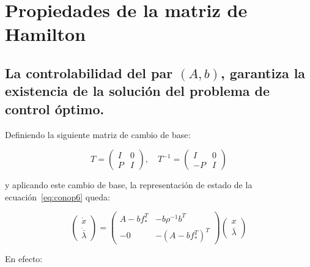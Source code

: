     \newpage
    \section{Propiedades de la matriz de Hamilton}

        \subsection{La controlabilidad del par $(A, b)$, garantiza la existencia de la solución del problema de control óptimo.}

            Definiendo la siguiente matriz de cambio de base:

            \begin{equation}
                T =
                \begin{pmatrix}
                    I & 0 \\
                    P & I
                \end{pmatrix}, \quad T^{-1} =
                \begin{pmatrix}
                    I & 0 \\
                    -P & I
                \end{pmatrix}
            \end{equation}

            y aplicando este cambio de base, la representación de estado de la ecuación~\ref{eq:conop6} queda:

            \begin{equation} \label{eq:conop10}
                \begin{pmatrix}
                    \dot{x} \\
                    \dot{\bar{\lambda}}
                \end{pmatrix} =
                \begin{pmatrix}
                    A - b f_*^T & -b \rho^{-1} b^T \\
                    -0 & - (A - b f_*^T)^T
                \end{pmatrix}
                \begin{pmatrix}
                    x \\
                    \bar{\lambda}
                \end{pmatrix}
            \end{equation}

            En efecto:

